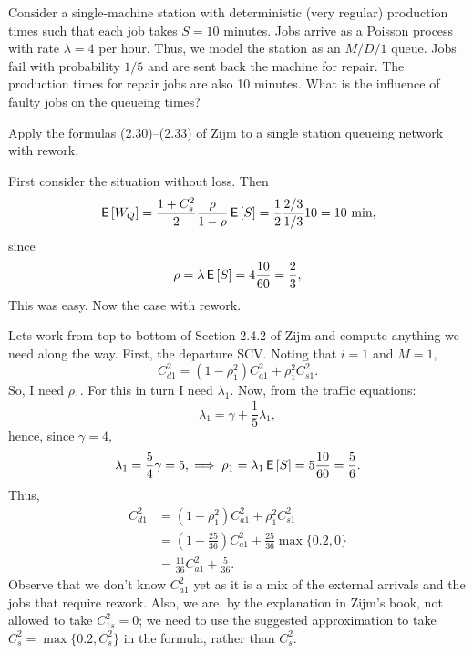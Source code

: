 \begin{exercise}
Consider a single-machine station with deterministic (very regular)
production times such that each job takes $S=10$ minutes. Jobs arrive
as a Poisson process with rate $\lambda=4$ per hour. Thus, we model
the station as an $M/D/1$ queue. Jobs fail with probability $1/5$ and
are sent back the machine for repair. The production times for repair
jobs are also 10 minutes.  What is the influence of faulty jobs on the
queueing times? 
\begin{hint}
Apply the formulas (2.30)--(2.33) of Zijm to a single station
  queueing network with rework.
\end{hint}
\begin{solution}
  First consider the situation without loss. Then
  \begin{equation*}
    \,\mathsf{E}\left[W_Q\right] = \frac{1+C_s^2}2 \frac{\rho}{1-\rho} \,\mathsf{E}\left[S\right] = \frac 12 \frac{2/3}{1/3} 10 = 10 \text{ min},
  \end{equation*}
since 
\begin{equation*}
\rho=\lambda \,\mathsf{E}\left[S\right] = 4 \frac{10}{60} = \frac 23,
\end{equation*}
This was easy. Now the case with rework.

Lets work from top to bottom of Section 2.4.2 of Zijm and compute
anything we need along the way. First, the departure SCV. Noting that
$i=1$ and $M=1$,
\begin{equation*}
  C_{d1}^2 
= (1-\rho_1^2)C_{a1}^2 + \rho_1^2 C_{s1}^2.
\end{equation*}
So, I need $\rho_1$. For this in turn I need $\lambda_1$. Now, from the traffic equations:
\begin{equation*}
  \lambda_ 1= \gamma + \frac15\lambda_1, 
\end{equation*}
hence, since $\gamma=4$,
\begin{equation*}
\lambda_1 = \frac 5 4 \gamma=5, \implies \rho_1 = \lambda_1 \,\mathsf{E}\left[S\right]=5\frac{10}{60}=\frac 56.
\end{equation*}
Thus, 
\begin{equation*}
  \begin{split}
  C_{d1}^2  
&= (1-\rho_1^2)C_{a1}^2 + \rho_1^2 C_{s1}^2\\
&= (1-\frac{25}{36})C_{a1}^2 + \frac{25}{36}\max\{0.2, 0\}\\
&= \frac{11}{36}C_{a1}^2 + \frac{5}{36}.
  \end{split}
\end{equation*}
Observe that we don't know $C_{a1}^2$ yet as it is a mix of the
external arrivals and the jobs that require rework. Also, we are, by
the explanation in Zijm's book, not allowed to take $C_{1s}^2=0$; we
need to use the suggested approximation to take
$C_s^2 = \max\{0.2, C_s^2\}$ in the formula, rather than $C_s^2$.


\end{solution}
\end{exercise}
